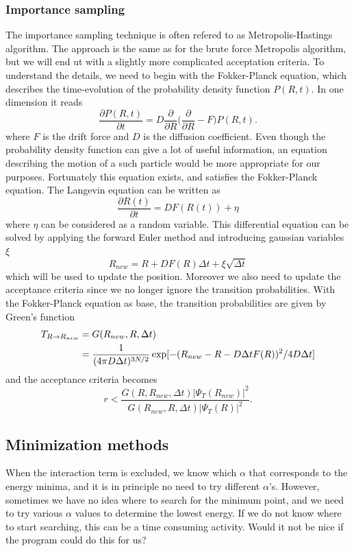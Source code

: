 \documentclass[norsk,a4paper,12pt]{article}
\begin{document}
\subsubsection{Importance sampling}
The importance sampling technique is often refered to as Metropolis-Hastings algorithm. The approach is the same as for the brute force Metropolis algorithm, but we will end ut with a slightly more complicated acceptation criteria. To understand the details, we need to begin with the Fokker-Planck equation, which describes the time-evolution of the probability density function $P(R,t)$. In one dimension it reads
\begin{equation}
\frac{\partial P(R,t)}{\partial t} = D\frac{\partial}{\partial R}\bigg(\frac{\partial}{\partial R} - F\bigg)P(R,t).
\end{equation}
where $F$ is the drift force and $D$ is the diffusion coefficient. Even though the probability density function can give a lot of useful information, an equation describing the motion of a such particle would be more appropriate for our purposes. Fortunately this equation exists, and satisfies the Fokker-Planck equation. The Langevin equation can be written as
\begin{equation}
\frac{\partial R(t)}{\partial t}=DF(R(t)) + \eta
\end{equation}
where $\eta$ can be considered as a random variable. This differential equation can be solved by applying the forward Euler method and introducing gaussian variables $\xi$
\begin{equation}
R_{new} = R + DF(R)\Delta t + \xi\sqrt{\Delta t}
\end{equation}
which will be used to update the position. Moreover we also need to update the acceptance criteria since we no longer ignore the transition probabilities. With the Fokker-Planck equation as base, the transition probabilities are given by Green's function
\begin{align}
T_{R\rightarrow R_{new}}&=G(R_{new},R,\Delta t)\notag\\
&=\frac{1}{(4\pi D\Delta t)^{3N/2}}\exp[-(R_{new} - R - D\Delta tF(R))^2/4D\Delta t] 
\end{align}
and the acceptance criteria becomes
\begin{equation}
r<\frac{G(R,R_{new},\Delta t)|\Psi_T(R_{new})|^2}{G(R_{new},R,\Delta t)|\Psi_T(R)|^2}.
\end{equation}

\subsection{Minimization methods}
When the interaction term is excluded, we know which $\alpha$ that corresponds to the energy minima, and it is in principle no need to try different $\alpha$'s. However, sometimes we have no idea where to search for the minimum point, and we need to try various $\alpha$ values to determine the lowest energy. If we do not know where to start searching, this can be a time consuming activity. Would it not be nice if the program could do this for us?
\end{document}
